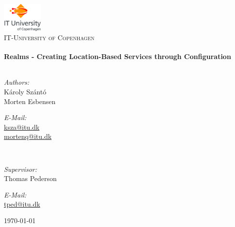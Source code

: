 \begin{titlepage}

\begin{center}


\includegraphics[width=0.15\textwidth]{./fig/itu_logo}\\[1cm]    

\textsc{\LARGE IT-University of Copenhagen}\\[2.0cm]

\HRule \\[0.4cm]
{ \huge \bfseries Realms - Creating Location-Based Services through Configuration}\\[0.4cm]

\HRule \\[1.5cm]

\begin{minipage}{0.4\textwidth}
\begin{flushleft} \large
\emph{Authors:}\\
K\'aroly Sz\'ant\'o\\
Morten Esbensen\\
\end{flushleft}
\end{minipage}
\begin{minipage}{0.4\textwidth}
\begin{flushright} \large
\emph{E-Mail:} \\
\href{mailto:ksza@itu.dk}{ksza@itu.dk}\\
\href{mailto:mortenq@itu.dk}{mortenq@itu.dk}\\
\end{flushright}
\end{minipage}\\[0.8cm]

\begin{minipage}{0.4\textwidth}
\begin{flushleft} \large
\emph{Supervisor:}\\
Thomas Pederson\\
\end{flushleft}
\end{minipage}
\begin{minipage}{0.4\textwidth}
\begin{flushright} \large
\emph{E-Mail:} \\
\href{mailto:tped@itu.dk}{tped@itu.dk}\\
\end{flushright}
\end{minipage}

\vfill

{\large \today}

\end{center}

\end{titlepage}